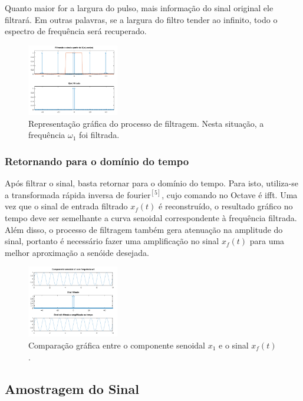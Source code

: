 \documentclass[journal]{IEEEtran}
\begin{document}
Quanto maior for a largura do pulso, mais informação do sinal original ele filtrará. Em outras palavras, se a largura do filtro tender ao infinito, todo o espectro de frequência será recuperado.

\begin{figure}[H]
\captionsetup{justification=centering}
\centering %
\includegraphics[width=4cm]{ex_filtrando.png} %
\caption{Representação gráfica do processo de filtragem. Nesta situação, a frequência $\omega$$_1$ foi filtrada.}
\end{figure}

\subsubsection{Retornando para o domínio do tempo}

Após filtrar o sinal, basta retornar para o domínio do tempo. Para isto, utiliza-se a transformada rápida inversa de fourier$^{[5]}$, cujo comando no Octave é {\selectfont ifft}. Uma vez que o sinal de entrada filtrado $x$$_f$$(t)$ é reconstruído, o resultado gráfico no tempo deve ser semelhante a curva senoidal correspondente à frequência filtrada. Além disso, o processo de filtragem também gera atenuação na amplitude do sinal, portanto é necessário fazer uma amplificação no sinal $x$$_f$$(t)$ para uma melhor aproximação a senóide desejada.

\begin{figure}[H]
\captionsetup{justification=centering}
\centering %
\includegraphics[width=4cm]{ex_amplificando.png} %
\caption{Comparação gráfica entre o componente senoidal $x_1$ e o sinal $x$$_f$$(t)$.}
\end{figure}

\subsection{Amostragem do Sinal}
\end{document}
